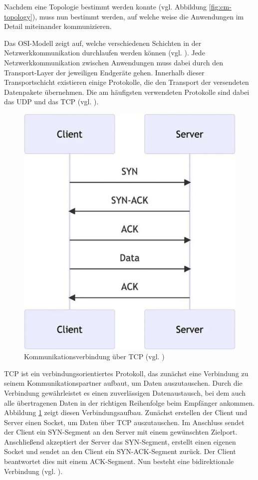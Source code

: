 Nachdem eine Topologie bestimmt werden konnte (vgl. Abbildung \ref{fig:cm-topology}), muss nun bestimmt werden, auf welche weise die Anwendungen im Detail miteinander kommunizieren. 

Das \ac{OSI}-Modell zeigt auf, welche verschiedenen Schichten in der Netzwerkkommunikation durchlaufen werden können (vgl. \cite{noauthor_osi-modell_nodate}). Jede Netzwerkkommunikation zwischen Anwendungen muss dabei durch den Transport-Layer der jeweiligen Endgeräte gehen. Innerhalb dieser Transportschicht existieren einige Protokolle, die den Transport der versendeten Datenpakete übernehmen. Die am häufigsten verwendeten Protokolle sind dabei das \ac{UDP} und das \ac{TCP} (vgl. \cite{noauthor_transport_nodate}). 

\begin{figure}[ht]
\centering
\includegraphics[width=0.5\linewidth]{content/pictures/TCP-Network.png}
\caption{Kommunikationsverbindung über TCP (vgl. \cite{mygames_unity_2024})}
\label{fig:tcp}
\end{figure}

\ac{TCP} ist ein verbindungsorientiertes Protokoll, das zunächst eine Verbindung zu seinem Kommunikationspartner aufbaut, um Daten auszutauschen. Durch die Verbindung gewährleistet es einen zuverlässigen Datenaustausch, bei dem auch alle übertragenen Daten in der richtigen Reihenfolge beim Empfänger ankommen. Abbildung \ref{fig:tcp} zeigt diesen Verbindungsaufbau.
Zunächst erstellen der Client und Server einen Socket, um Daten über \ac{TCP} auszutauschen. Im Anschluss sendet der Client ein \ac{SYN}-Segment an den Server mit einem gewünschten Zielport. Anschließend akzeptiert der Server das \ac{SYN}-Segment, erstellt einen eigenen Socket und sendet an den Client ein \ac{SYN}-\ac{ACK}-Segment zurück. Der Client beantwortet dies mit einem \ac{ACK}-Segment. Nun besteht eine bidirektionale Verbindung  (vgl. \cite{mygames_unity_2024}).

